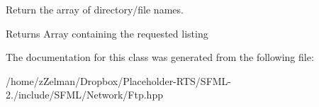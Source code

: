 Return the array of directory/file names. 

\begin{DoxyReturn}{Returns}
Array containing the requested listing 
\end{DoxyReturn}


The documentation for this class was generated from the following file\-:\begin{DoxyCompactItemize}
\item 
/home/z\-Zelman/\-Dropbox/\-Placeholder-\/\-R\-T\-S/\-S\-F\-M\-L-\/2./include/\-S\-F\-M\-L/\-Network/Ftp.\-hpp\end{DoxyCompactItemize}

